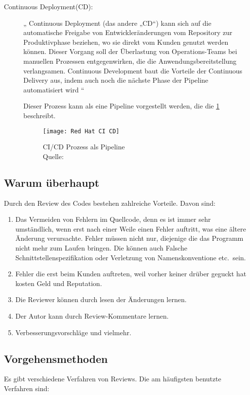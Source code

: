 \begin{description}
	\item [Continuous Deployment(CD):]
		„ Continuous Deployment (das andere „CD“) kann sich auf die automatische Freigabe von Entwickleränderungen vom Repository zur Produktivphase beziehen, wo sie direkt vom Kunden 			genutzt werden können. Dieser Vorgang soll der Überlastung von Operations-Teams bei manuellen Prozessen entgegenwirken, die die Anwendungsbereitstellung verlangsamen. Continuous 		Development baut die Vorteile der Continuous Delivery aus, indem auch noch die nächste Phase der Pipeline automatisiert wird “ \cite{RedHat}

	Dieser Prozess kann als eine Pipeline vorgestellt werden, die die \cref{fig:RedHat} beschreibt.
	\begin{figure}[H]
		\centering
		\texttt{[image: Red Hat CI CD]}
		\caption[\ac{CI}/\ac{CD}]{\ac{CI}/\ac{CD} Prozess als Pipeline\\ Quelle:\cite{RedHat}}
		\label{fig:RedHat}
	\end{figure}
	
\end{description}

\subsection{Warum überhaupt}
\label{subsec:Gründe}
Durch den Review des Codes bestehen zahlreiche Vorteile. Davon sind:

\begin{enumerate}
	\item Das Vermeiden von Fehlern im Quellcode, denn es ist immer sehr umständlich, wenn erst nach einer Weile einen Fehler auftritt, was eine ältere Änderung verursachte.
		Fehler müssen nicht nur, diejenige die das Programm nicht mehr zum Laufen bringen. Die können auch Falsche Schnittstellenspezifikation oder Verletzung von Namenskonventione 
		etc.\ sein.
	\item Fehler die erst beim Kunden auftreten, weil vorher keiner drüber geguckt hat kosten Geld und Reputation.
	\item Die Reviewer können durch lesen der Änderungen lernen.
	\item Der Autor kann durch Review-Kommentare lernen.
	\item Verbesserungsvorschläge und vielmehr.
\end{enumerate}

\subsection{Vorgehensmethoden}
\label{subsec:Vorgehensmethoden}
Es gibt verschiedene Verfahren von Reviews. Die am häufigsten benutzte Verfahren sind:

